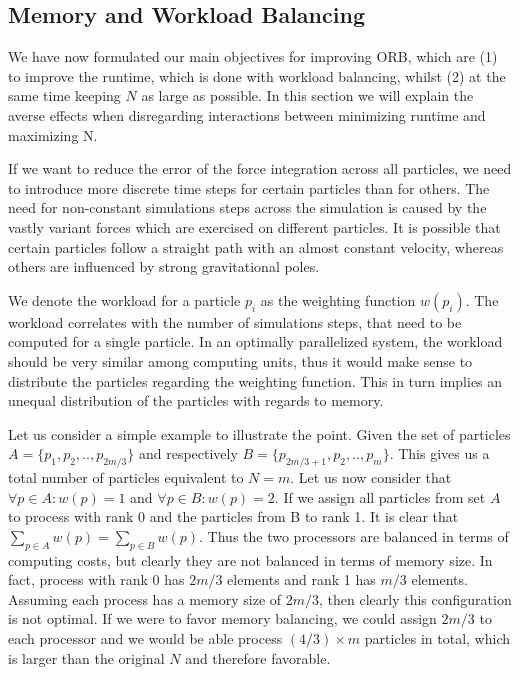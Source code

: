 \documentclass[]{article}
\begin{document}
\subsection{Memory and Workload Balancing}\label{balancing}
We have now formulated our main objectives for improving ORB, which are (1) to improve the runtime, which is done with workload balancing, whilst (2) at the same time keeping $N$ as large as possible. In this section we will explain the averse effects when disregarding interactions between minimizing runtime and maximizing N.



If we want to reduce the error of the force integration across all particles, we need to introduce more discrete time steps for certain particles than for others. The need for non-constant simulations steps across the simulation is caused by the vastly variant forces which are exercised on different particles. It is possible that certain particles follow a straight path with an almost constant velocity, whereas others are influenced by strong gravitational poles. 

We denote the workload for a particle $p_i$ as the weighting function $w(p_i)$. The workload correlates with the number of simulations steps, that need to be computed for a single particle. In an optimally parallelized system, the workload should be very similar among computing units, thus it would make sense to distribute the particles regarding the weighting function. This in turn implies an unequal distribution of the particles with regards to memory.

Let us consider a simple example to illustrate the point. Given the set of particles $A = \{p_1, p_2, .., p_{2m/3}\}$ and respectively $B = \{p_{2m/3 + 1}, p_2, .., p_{m}\}$. This gives us a total number of particles equivalent to $N = m$. Let us now consider that $\forall p \in A : w(p) = 1$ and $\forall p \in B : w(p) = 2$. If we assign all particles from set $A$ to process with rank 0 and the particles from B to rank 1. It is clear that $\sum_{p\in A} w(p) = \sum_{p\in B} w(p)$. Thus the two processors are balanced in terms of computing costs, but clearly they are not balanced in terms of memory size. In fact, process with rank 0 has $2m/3$ elements and rank 1 has $m/3$ elements. Assuming each process has a memory size of $2m/3$, then clearly this configuration is not optimal. If we were to favor memory balancing, we could assign $2m/3$ to each processor and we would be able process $(4/3) \times m$ particles in total, which is larger than the original $N$ and therefore favorable.
\end{document}
